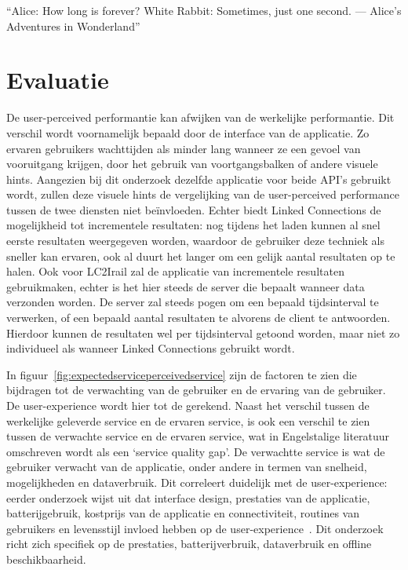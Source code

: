 \begin{savequote}[0.55\linewidth]
	``Alice: How long is forever? White Rabbit: Sometimes, just one second. —  Alice's Adventures in Wonderland''
\end{savequote}

\chapter{Evaluatie}

\label{chap:onderzoek}
De user-perceived performantie kan afwijken van de werkelijke performantie. Dit verschil wordt voornamelijk bepaald door de interface van de applicatie. Zo ervaren gebruikers wachttijden als minder lang wanneer ze een gevoel van vooruitgang krijgen, door het gebruik van voortgangsbalken of andere visuele hints. Aangezien bij dit onderzoek dezelfde applicatie voor beide API's gebruikt wordt, zullen deze visuele hints de vergelijking van de user-perceived performance tussen de twee diensten niet beïnvloeden. Echter biedt Linked Connections de mogelijkheid tot incrementele resultaten: nog tijdens het laden kunnen al snel eerste resultaten weergegeven worden, waardoor de gebruiker deze techniek als sneller kan ervaren, ook al duurt het langer om een gelijk aantal resultaten op te halen. Ook voor LC2Irail zal de applicatie van incrementele resultaten gebruikmaken, echter is het hier steeds de server die bepaalt wanneer data verzonden worden. De server zal steeds pogen om een bepaald tijdsinterval te verwerken, of een bepaald aantal resultaten te  alvorens de client te antwoorden. Hierdoor kunnen de resultaten wel per tijdsinterval getoond worden, maar niet zo individueel als wanneer Linked Connections gebruikt wordt.

In figuur~\ref{fig:expectedserviceperceivedservice} zijn de factoren te zien die bijdragen tot de verwachting van de gebruiker en de ervaring van de gebruiker. De user-experience wordt hier tot de  gerekend. Naast het verschil tussen de werkelijke geleverde service en de ervaren service, is ook een verschil te zien tussen de verwachte service en de ervaren service, wat in Engelstalige literatuur omschreven wordt als een `service quality gap'. De verwachtte service is wat de gebruiker verwacht van de applicatie, onder andere in termen van snelheid, mogelijkheden en dataverbruik. Dit correleert duidelijk met de user-experience: eerder onderzoek wijst uit dat interface design, prestaties van de applicatie, batterijgebruik, kostprijs van de applicatie en connectiviteit, routines van gebruikers en levensstijl invloed hebben op de user-experience~\citep{ickin12}. Dit onderzoek richt zich specifiek op de prestaties, batterijverbruik, dataverbruik en offline beschikbaarheid.

